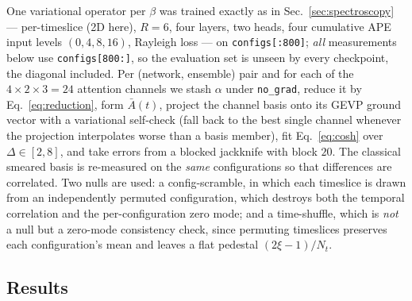 \documentclass[aps,prl,reprint,superscriptaddress,nofootinbib]{revtex4-2}
\newcommand{\Abar}{\bar{A}}
\begin{document}
One variational operator per $\beta$ was trained exactly as in
Sec.~\ref{sec:spectroscopy} --- per-timeslice (2D here), $R=6$, four layers, two
heads, four cumulative APE input levels $(0,4,8,16)$, Rayleigh loss --- on
\texttt{configs[:800]}; \emph{all} measurements below use \texttt{configs[800:]},
so the evaluation set is unseen by every checkpoint, the diagonal included. Per
(network, ensemble) pair and for each of the $4\times2\times3=24$ attention
channels we stash $\alpha$ under \texttt{no\_grad}, reduce it by
Eq.~\eqref{eq:reduction}, form $\Abar(t)$, project the channel basis onto its
GEVP ground vector with a variational self-check (fall back to the best single
channel whenever the projection interpolates worse than a basis member), fit
Eq.~\eqref{eq:cosh} over $\Delta\in[2,8]$, and take errors from a blocked
jackknife with block $20$. The classical smeared basis is re-measured on the
\emph{same} configurations so that differences are correlated. Two nulls are
used: a config-scramble, in which each timeslice is drawn from an independently
permuted configuration, which destroys both the temporal correlation and the
per-configuration zero mode; and a time-shuffle, which is \emph{not} a null but a
zero-mode consistency check, since permuting timeslices preserves each
configuration's mean and leaves a flat pedestal $(2\xi-1)/N_t$.

\subsection{Results}
\end{document}
